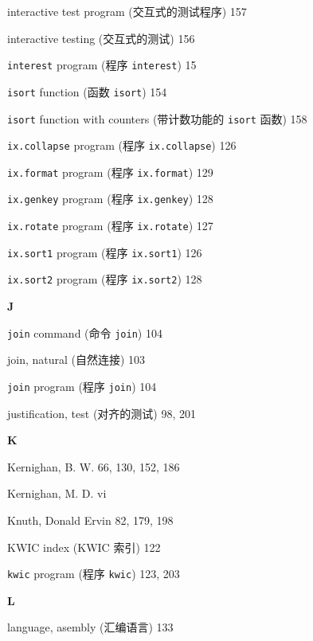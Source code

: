 \begin{multicols}{2}
\hangindent=2pc  interactive test program (交互式的测试程序) 157

\hangindent=2pc  interactive testing (交互式的测试) 156

\hangindent=2pc  \verb'interest' program (程序 \verb'interest') 15 

\hangindent=2pc  \verb'isort' function (函数 \verb'isort') 154

\hangindent=2pc  \verb'isort' function with counters
(带计数功能的 \verb'isort' 函数) 158

\hangindent=2pc  \verb'ix.collapse' program (程序
\verb'ix.collapse') 126

\hangindent=2pc  \verb'ix.format' program (程序
\verb'ix.format') 129 

\hangindent=2pc  \verb'ix.genkey' program (程序
\verb'ix.genkey') 128 

\hangindent=2pc  \verb'ix.rotate' program (程序
\verb'ix.rotate') 127 

\hangindent=2pc  \verb'ix.sort1' program (程序 \verb'ix.sort1') 126

\hangindent=2pc  \verb'ix.sort2' program (程序 \verb'ix.sort2') 128 

\medskip\textbf{\large{J}}

\hangindent=2pc  \verb'join' command (命令 \verb'join') 104

\hangindent=2pc  join, natural (自然连接) 103

\hangindent=2pc  \verb'join' program (程序 \verb'join') 104

\hangindent=2pc  justification, test (对齐的测试) 98, 201

\medskip\textbf{\large{K}}

\hangindent=2pc  Kernighan, B. W. 66, 130, 152, 186

\hangindent=2pc  Kernighan, M. D. vi 

\hangindent=2pc  Knuth, Donald Ervin 82, 179, 198

\hangindent=2pc  KWIC index (KWIC 索引) 122

\hangindent=2pc  \verb'kwic' program (程序 \verb'kwic') 123, 203

\medskip\textbf{\large{L}}

\hangindent=2pc  language, asembly (汇编语言) 133


\end{multicols}

